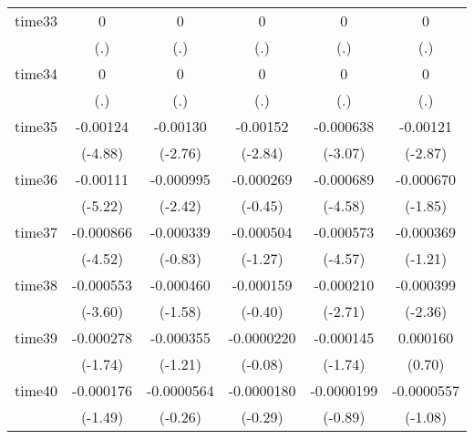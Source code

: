\begin{table}[htbp]
\begin{tabular}{l*{5}{c}}
time33      &           0         &           0         &           0         &           0         &           0         \\
            &         (.)         &         (.)         &         (.)         &         (.)         &         (.)         \\
time34      &           0         &           0         &           0         &           0         &           0         \\
            &         (.)         &         (.)         &         (.)         &         (.)         &         (.)         \\
time35      &    -0.00124\sym{***}&    -0.00130\sym{**} &    -0.00152\sym{**} &   -0.000638\sym{**} &    -0.00121\sym{**} \\
            &     (-4.88)         &     (-2.76)         &     (-2.84)         &     (-3.07)         &     (-2.87)         \\
time36      &    -0.00111\sym{***}&   -0.000995\sym{*}  &   -0.000269         &   -0.000689\sym{***}&   -0.000670         \\
            &     (-5.22)         &     (-2.42)         &     (-0.45)         &     (-4.58)         &     (-1.85)         \\
time37      &   -0.000866\sym{***}&   -0.000339         &   -0.000504         &   -0.000573\sym{***}&   -0.000369         \\
            &     (-4.52)         &     (-0.83)         &     (-1.27)         &     (-4.57)         &     (-1.21)         \\
time38      &   -0.000553\sym{***}&   -0.000460         &   -0.000159         &   -0.000210\sym{**} &   -0.000399\sym{*}  \\
            &     (-3.60)         &     (-1.58)         &     (-0.40)         &     (-2.71)         &     (-2.36)         \\
time39      &   -0.000278         &   -0.000355         &  -0.0000220         &   -0.000145         &    0.000160         \\
            &     (-1.74)         &     (-1.21)         &     (-0.08)         &     (-1.74)         &      (0.70)         \\
time40      &   -0.000176         &  -0.0000564         &  -0.0000180         &  -0.0000199         &  -0.0000557         \\
            &     (-1.49)         &     (-0.26)         &     (-0.29)         &     (-0.89)         &     (-1.08)         \\

\end{tabular}
\end{table}
